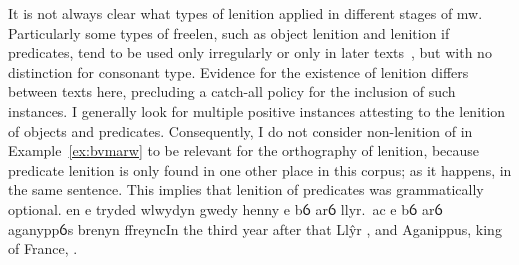 It is not always clear what types of lenition applied in different
stages of \gls{mw}. Particularly some types of \gls{freelen},
such as object lenition and lenition if predicates, tend to be used only irregularly
or only in later texts~\autocite{van_development14}, but
with no distinction for consonant type. Evidence for the existence of
lenition differs between texts here, precluding a catch-all policy for
the inclusion of such instances. I generally look for multiple positive
instances attesting to the lenition of objects and predicates.
Consequently, I do not consider non-lenition of  in
Example~\ref{ex:bvmarw} to be relevant for the orthography of lenition,
because predicate lenition is only found in one other place in this corpus; as it happens, in the same sentence.
This implies that lenition of predicates was grammatically optional.
{en e tryded wlwydyn gwedy henny e bỽ arỽ llyr.\ ac e bỽ arỽ aganyppỽs brenyn ffreync}{In the third year after that Llŷr , and Aganippus, king of France, .}

